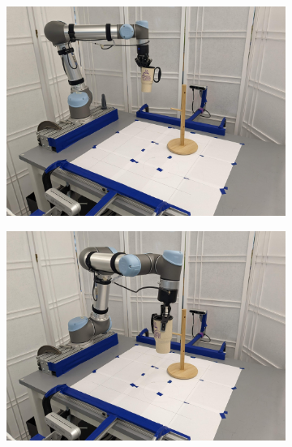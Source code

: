 \documentclass{article}
\begin{document}
\begin{figure}[]
\begin{subfigure}{(\linewidth - 0.05\linewidth)/5}
        \includegraphics[width=\linewidth]{figures/episodes/mug_on_tree/7.jpg}
    \end{subfigure}
    \begin{subfigure}{(\linewidth - 0.05\linewidth)/5}
        \centering
        \includegraphics[width=\linewidth]{figures/episodes/mug_on_tree/8.jpg}
    \end{subfigure}
    \begin{subfigure}{(\linewidth - 0.05\linewidth)/5}
        \centering

\end{subfigure}
\end{figure}
\end{document}
